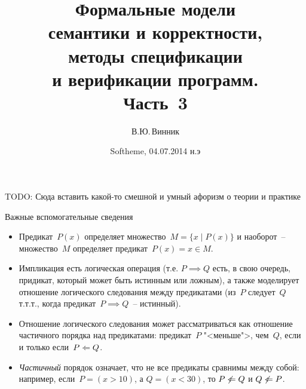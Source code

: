 \documentclass[landscape]{slides}
\begin{document}
\author{В.Ю.\,Винник}

\title{%
Формальные модели\\%
семантики и корректности,\\%
методы спецификации\\%
и верификации программ.\\
Часть~3}

\date{Softheme, 04.07.2014 н.э}

\maketitle

\begin{slide}
        \begin{center}
                \begin{LARGE}
                        TODO: Сюда вставить какой-то смешной и умный афоризм о теории и практике
                \end{LARGE}
        \end{center}
\end{slide}

\begin{slide}
        Важные вспомогательные сведения
        \begin{itemize}
                \item Предикат~$P(x)$ определяет множество~$M=\{x\mid P(x)\}$ и наоборот~-- множество~$M$
                        определяет предикат~$P(x) = x\in M$.
                \item Импликация есть логическая операция (т.е. $P\implies Q$ есть, в свою очередь,
                        придикат, который может быть истинным или ложным), а также моделирует отношение логического
                        следования между предикатами (из~$P$ следует~$Q$ т.т.т., когда предикат~$P\implies Q$~-- истинный).
                \item Отношение логического следования может рассматриваться как отношение частичного порядка
                        над предикатами: предикат~$P$ "<меньше">, чем~$Q$, если и только если~$P\Leftarrow Q$.
                \item \emph{Частичный} порядок означает, что не все предикаты сравнимы между собой: например,
                        если~$P=(x>10)$, а $Q=(x<30)$, то $P\not\Leftarrow Q$ и $Q\not\Leftarrow P$.
        \end{itemize}
\end{slide}
\end{document}
